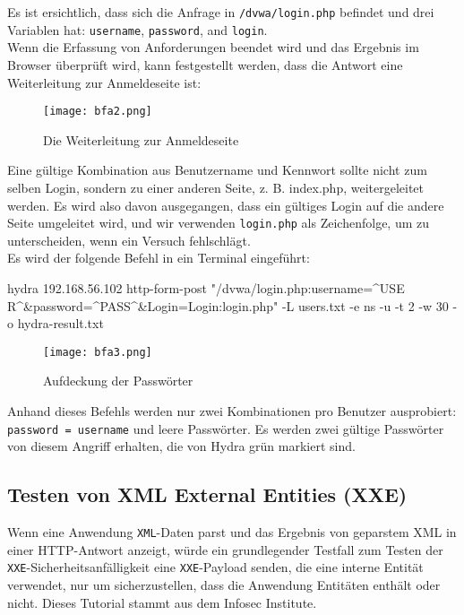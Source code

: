 Es ist ersichtlich, dass sich die Anfrage in \texttt{/dvwa/login.php} befindet und drei Variablen hat: \texttt{username}, \texttt{password}, and \texttt{login}.\\

Wenn die Erfassung von Anforderungen beendet wird und das Ergebnis im Browser überprüft wird, kann festgestellt werden, dass die Antwort eine Weiterleitung zur Anmeldeseite  ist\cite[144]{najera2016kali}:

\begin{figure}[h]
	\centering
	\texttt{[image: bfa2.png]}
	\caption{Die Weiterleitung zur Anmeldeseite}
\end{figure}

Eine gültige Kombination aus Benutzername und Kennwort sollte nicht zum selben Login, sondern zu einer anderen Seite, z. B. index.php, weitergeleitet werden. Es wird also davon ausgegangen, dass ein gültiges Login auf die andere Seite umgeleitet wird, und wir verwenden \texttt{login.php} als Zeichenfolge, um zu unterscheiden, wenn ein Versuch fehlschlägt\cite[145]{najera2016kali}.\\

Es wird der folgende Befehl in ein Terminal eingeführt\cite[145]{najera2016kali}:

\begin{LaTeXCode}[caption={Befehl durch Terminal},captionpos=b, label=LaTeXCode:beheldt1][numbers=none]
hydra 192.168.56.102 http-form-post "/dvwa/login.php:username=^USE
R^&password=^PASS^&Login=Login:login.php" -L users.txt -e ns -u -t 2 -w 30 -o hydra-result.txt
\end{LaTeXCode}

\begin{figure}[h]
	\centering
	\texttt{[image: bfa3.png]}
	\caption{Aufdeckung der Passwörter}
\end{figure}

Anhand dieses Befehls werden nur zwei Kombinationen pro Benutzer ausprobiert: \texttt{password = username} und leere Passwörter. Es werden zwei gültige Passwörter von diesem Angriff erhalten, die von Hydra grün markiert sind\cite[145]{najera2016kali}.

\subsection{Testen von XML External Entities (XXE)}

Wenn eine Anwendung \texttt{XML}-Daten parst und das Ergebnis von geparstem XML in einer HTTP-Antwort anzeigt, würde ein grundlegender Testfall zum Testen der \texttt{XXE}-Sicherheitsanfälligkeit eine \texttt{XXE}-Payload senden, die eine interne Entität verwendet, nur um sicherzustellen, dass die Anwendung Entitäten enthält oder nicht. Dieses Tutorial stammt aus dem Infosec Institute\cite{infosec18}.\\

